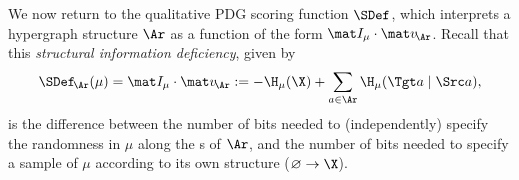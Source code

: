 We now return to the qualitative PDG scoring function $\SDef$, which interprets a hypergraph structure $\Ar$ as a function of the form $\mat I_\mu \cdot \mat v_{\!\Ar}$.
Recall that this \emph{structural information deficiency}, given by
\begin{equation}
    \SDef_{\!\Ar}(\mu) 
    = \mat I_\mu \cdot \mat v_{\!\Ar} 
    := - \H_\mu(\X)  + \sum_{a \in \Ar} \H_\mu(\Tgt a \mid \Src a)
    ,
        \label{eq:idef}
\end{equation}
is the difference between the number of bits needed to (independently) specify the randomness in $\mu$ along the \arc s of $\Ar$, and
the number of bits needed to specify a sample of $\mu$ according to its own structure 
($\varnothing \to \X$).
